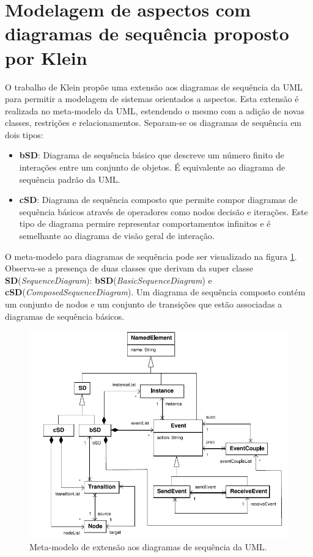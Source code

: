 \section{Modelagem de aspectos com diagramas de sequência proposto por Klein}

O trabalho de Klein \cite{Klein:2007:WMA:1805812.1805819} \cite{Klein:2006:SWS:1119655.1119662} propõe uma extensão aos diagramas de sequência da UML para permitir a modelagem
de sistemas orientados a aspectos. Esta extensão é realizada no meta-modelo da UML, estendendo o mesmo com a adição de novas classes, restrições e
relacionamentos. Separam-se os diagramas de sequência em dois tipos:

\begin{itemize}
  \item \textbf{bSD}: Diagrama de sequência básico que descreve um número finito de interações entre um conjunto de objetos. É equivalente ao diagrama
  de sequência padrão da UML.
  \item \textbf{cSD}: Diagrama de sequência composto que permite compor diagramas de sequência básicos através de operadores como nodos decisão
  e iterações. Este tipo de diagrama permire representar comportamentos infinitos e é semelhante ao diagrama de visão geral de interação.
\end{itemize}

O meta-modelo para diagramas de sequência pode ser visualizado na figura \ref{fig:klein_meta_model}. Observa-se a presença de duas classes que
derivam da super classe \textbf{SD}(\textit{SequenceDiagram}): \textbf{bSD}(\textit{BasicSequenceDiagram}) e
\textbf{cSD}(\textit{ComposedSequenceDiagram}). Um diagrama de sequência composto contém um conjunto de nodos e um conjunto de transições que estão
associadas a diagramas de sequência básicos.

\begin{figure}
	\centering
	\includegraphics[width=475px]{img/klein_meta_model.png}
	\caption{Meta-modelo de extensão aos diagramas de
	sequência da UML.}\label{fig:klein_meta_model}
\end{figure}

